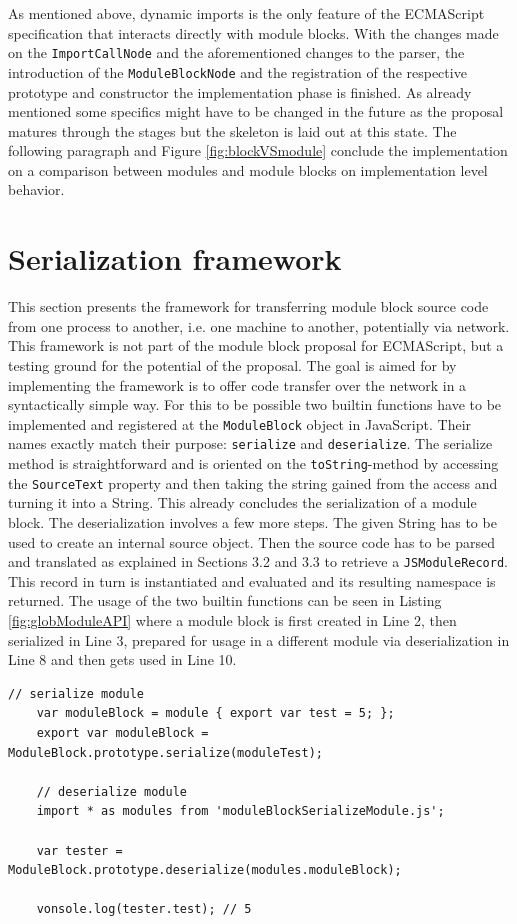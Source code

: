 As mentioned above, dynamic imports is the only feature of the ECMAScript specification that interacts directly with module blocks. With the changes made on the \texttt{ImportCallNode} and the aforementioned changes to the parser, the introduction of the \texttt{ModuleBlockNode} and the registration of the respective prototype and constructor the implementation phase is finished. As already mentioned some specifics might have to be changed in the future as the proposal matures through the stages but the skeleton is laid out at this state. The following paragraph and Figure \ref{fig:blockVSmodule} conclude the implementation on a comparison between modules and module blocks on implementation level behavior.

\section{Serialization framework}

This section presents the framework for transferring module block source code from one process to another, i.e. one machine to another, potentially via network. This framework is not part of the module block proposal for ECMAScript, but a testing ground for the potential of the proposal. The goal is aimed for by implementing the framework is to offer code transfer over the network in a syntactically simple way. For this to be possible two builtin functions have to be implemented and registered at the \texttt{ModuleBlock} object in JavaScript. Their names exactly match their purpose: \texttt{serialize} and \texttt{deserialize}. The serialize method is straightforward and is oriented on the \texttt{toString}-method by accessing the \texttt{SourceText} property and then taking the string gained from the access and turning it into a String. This already concludes the serialization of a module block. The deserialization involves a few more steps. The given String has to be used to create an internal source object. Then the source code has to be parsed and translated as explained in Sections 3.2 and 3.3 to retrieve a \texttt{JSModuleRecord}. This record in turn is instantiated and evaluated and its resulting namespace is returned. The usage of the two builtin functions can be seen in Listing \ref{fig:globModuleAPI} where a module block is first created in Line 2, then serialized in Line 3, prepared for usage in a different module via deserialization in Line 8 and then gets used in Line 10.

 \begin{lstlisting}[caption={ModuleBlock serialization / deserialization}, label={fig:globModuleAPI}]
     // serialize module
    var moduleBlock = module { export var test = 5; };
    export var moduleBlock = ModuleBlock.prototype.serialize(moduleTest);
    
    // deserialize module
    import * as modules from 'moduleBlockSerializeModule.js';
    
    var tester = ModuleBlock.prototype.deserialize(modules.moduleBlock);
    
    vonsole.log(tester.test); // 5
\end{lstlisting} 

